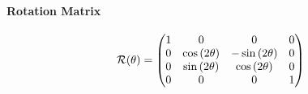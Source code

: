 \paragraph{Rotation Matrix}
\begin{align}
\mathcal{R}(\theta)=
\begin{split}
\begin{pmatrix}
    1 &                0 &               0 & 0 \\
    0 & \cos{(2\theta)} & -\sin{(2\theta)} & 0 \\
    0 & \sin{(2\theta)} & \cos{(2\theta)} & 0 \\
    0 &                0 &               0 & 1
  \end{pmatrix}
\end{split}
\end{align}
% 
% 
% 
